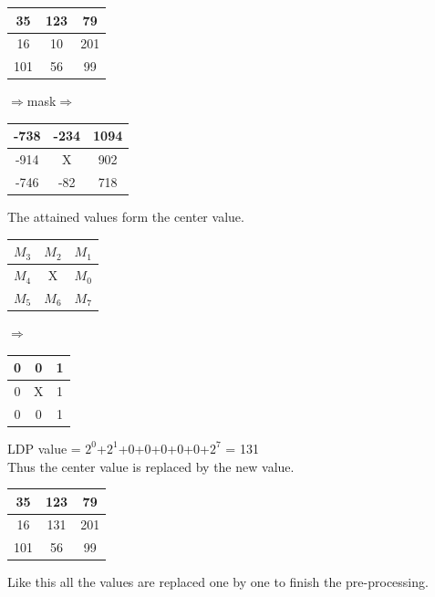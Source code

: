 \documentclass[conference]{IEEEtran}
\begin{document}
\begin{center}
	\begin{tabular}{|c|c|c|}
		\hline
		35 & 123 & 79 \\
		\hline
		16 & 10 & 201 \\
		\hline
		101 & 56 & 99 \\
		\hline
	\end{tabular}
	$\Longrightarrow$mask$\Longrightarrow$
	\begin{tabular}{|c|c|c|}
		\hline
		-738 & -234 & 1094 \\
		\hline
		-914 & X & 902 \\
		\hline
		-746 & -82 & 718 \\
		\hline
	\end{tabular}
\end{center}
\begin{center}
	The attained values form the center value.\\
\end{center}
\begin{center}
	\begin{tabular}{|c|c|c|}
		\hline
		$M_3$ & $M_2$ & $M_1$ \\
		\hline
		$M_4$ & X & $M_0$ \\
		\hline
		$M_5$ & $M_6$ & $M_7$ \\
		\hline
	\end{tabular}
	$\Longrightarrow$
	\begin{tabular}{|c|c|c|}
		\hline
		0 & 0 & 1 \\
		\hline
		0 & X & 1 \\
		\hline
		0 & 0 & 1 \\
		\hline
	\end{tabular}
\end{center}
\begin{center}
	LDP value = $2^0$+$2^1$+0+0+0+0+0+$2^7$ = 131\\
	Thus the center value is replaced by the new value.
\end{center}
\begin{center}
	\begin{tabular}{|c|c|c|}
		\hline
		35 & 123 & 79 \\
		\hline
		16 & 131 & 201 \\
		\hline
		101 & 56 & 99 \\
		\hline
	\end{tabular}
\end{center}

Like this all the values are replaced one by one to finish the pre-processing.
\end{document}
